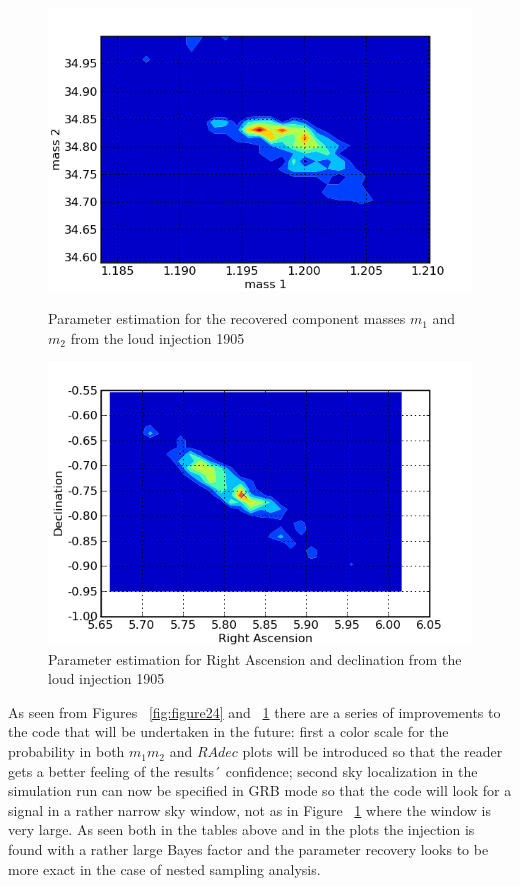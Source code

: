 \documentclass[epsf]{article}
\begin{document}
\begin{figure}[ht]
\begin{minipage}[b]{0.5\linewidth}
\centering
\includegraphics[scale=0.40]{m1m2_1905.png}
\caption{Parameter estimation for the recovered component masses $m_1$ and $m_2$ from the loud injection 1905}
\label{fig:figure24}
\end{minipage}
\hspace{0.5cm}
\begin{minipage}[b]{0.5\linewidth}
\centering
\includegraphics[scale=0.40]{RAdec_1905.png}
\caption{Parameter estimation for Right Ascension and declination from the loud injection 1905}
\label{fig:figure25}
\end{minipage}
\end{figure}

As seen from Figures ~\ref{fig:figure24} and ~\ref{fig:figure25} there are a series of improvements to the code that will be undertaken in the future: first a color scale for the probability in both $m_1m_2$ and $RAdec$ plots will be introduced so that the reader gets a better feeling of the results´ confidence; second sky localization in the simulation run can now be specified in GRB mode so that the code will look for a signal in a rather narrow sky window, not as in Figure ~\ref{fig:figure25} where the window is very large. As seen both in the tables above and in the plots the injection is found with a rather large Bayes factor and the parameter recovery looks to be more exact in the case of nested sampling analysis.
 
\end{document}
